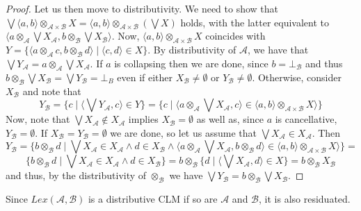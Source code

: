 \documentclass[a4paper]{elsarticle}
\newcommand{\1}{\mathbf{1}}
\begin{document}
\begin{proof}
	Let us then move to distributivity. We need to show that
	$\bigvee \langle a, b\rangle \otimes_{\mathcal{A} \times \mathcal{B}} X = \langle a, b\rangle \otimes_{\mathcal{A} \times \mathcal{B}}  (\bigvee X)$ holds,
	with the latter equivalent to $\langle a \otimes_\mathcal{A} \bigvee X_\mathcal{A}, b \otimes_\mathcal{B} \bigvee X_\mathcal{B} \rangle$.
	Now, $\langle a, b\rangle \otimes_{\mathcal{A} \times \mathcal{B}} X$ coincides with 
	$Y = \{\langle a \otimes_\mathcal{A}  c,  b \otimes_\mathcal{B}  d \rangle \mid \langle c, d \rangle \in X\}$.
	By distributivity of $\mathcal{A}$, we have that $\bigvee Y_\mathcal{A} = a \otimes_\mathcal{A} \bigvee X_\mathcal{A}$.
	If $a$ is collapsing then we are done, since $b = \bot_\mathcal{B}$ and thus $b \otimes_\mathcal{B} \bigvee X_\mathcal{B} = 
	\bigvee Y_\mathcal{B} = \bot_{B}$
	even if either $X_\mathcal{B} \neq \emptyset$ or $Y_\mathcal{B} \neq \emptyset$. Otherwise, 
	consider $X_\mathcal{B}$ and note that 
	$$Y_\mathcal{B} = \{ c \mid \langle \bigvee Y_\mathcal{A}, c \rangle \in Y\}
	= \{ c \mid \langle a \otimes_\mathcal{A} \bigvee X_\mathcal{A}, c \rangle \in \langle a, b\rangle \otimes_{\mathcal{A} \times \mathcal{B}} X \rangle \}$$
	\noindent
	Now, note that $\bigvee X_\mathcal{A} \not \in X_\mathcal{A}$ implies $X_\mathcal{B} = \emptyset$ as well as, since $a$ is cancellative, $Y_\mathcal{B} = \emptyset$.
	If $X_\mathcal{B} = Y_\mathcal{B} = \emptyset$ we are done, so let us assume that $\bigvee X_\mathcal{A} \in X_\mathcal{A}$. Then
	$$Y_\mathcal{B} = \{ b \otimes_\mathcal{B}   d \mid \bigvee X_\mathcal{A} \in X_\mathcal{A} \wedge d \in X_\mathcal{B} \wedge 
	      \langle a \otimes_\mathcal{A} \bigvee X_\mathcal{A}, b  \otimes_\mathcal{B} d \rangle \in \langle a, b\rangle \otimes_{\mathcal{A} \times \mathcal{B}} X \rangle \} =$$
	$$\{ b \otimes_\mathcal{B} d \mid  \bigvee X_\mathcal{A} \in X_\mathcal{A}  \wedge d \in X_\mathcal{B}\} =
	    b \otimes_\mathcal{B} \{ d \mid \langle \bigvee X_\mathcal{A}, d \rangle \in X \} = b \otimes_\mathcal{B} X_\mathcal{B}$$
	\noindent
	and thus, by the distributivity of $\otimes_\mathcal{B}$ we have $\bigvee Y_\mathcal{B} = b \otimes_\mathcal{B} \bigvee X_\mathcal{B}$.
\end{proof}

Since $Lex(\mathcal{A},\mathcal{B})$ is a distributive CLM if so are $\mathcal{A}$ and $\mathcal{B}$, it is also residuated.
\end{document}
